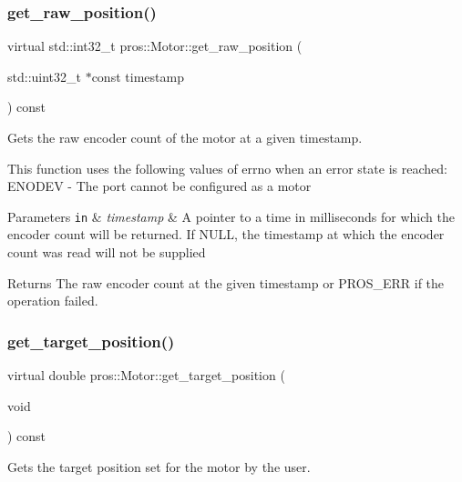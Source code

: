 \subsubsection{\texorpdfstring{get\+\_\+raw\+\_\+position()}{get\_raw\_position()}}
{\footnotesize\ttfamily virtual std\+::int32\+\_\+t pros\+::\+Motor\+::get\+\_\+raw\+\_\+position (\begin{DoxyParamCaption}\item[{std\+::uint32\+\_\+t $\ast$const}]{timestamp }\end{DoxyParamCaption}) const\hspace{0.3cm}{\ttfamily [virtual]}}

Gets the raw encoder count of the motor at a given timestamp.

This function uses the following values of errno when an error state is reached\+: E\+N\+O\+D\+EV -\/ The port cannot be configured as a motor


\begin{DoxyParams}[1]{Parameters}
\mbox{\tt in}  & {\em timestamp} & A pointer to a time in milliseconds for which the encoder count will be returned. If N\+U\+LL, the timestamp at which the encoder count was read will not be supplied\\
\hline
\end{DoxyParams}
\begin{DoxyReturn}{Returns}
The raw encoder count at the given timestamp or P\+R\+O\+S\+\_\+\+E\+RR if the operation failed. 
\end{DoxyReturn}
\mbox{\label{classpros_1_1Motor_a7ad83a73bf15b94aaad8d10970bb254c}} 
\subsubsection{\texorpdfstring{get\+\_\+target\+\_\+position()}{get\_target\_position()}}
{\footnotesize\ttfamily virtual double pros\+::\+Motor\+::get\+\_\+target\+\_\+position (\begin{DoxyParamCaption}\item[{void}]{ }\end{DoxyParamCaption}) const\hspace{0.3cm}{\ttfamily [virtual]}}

Gets the target position set for the motor by the user.

